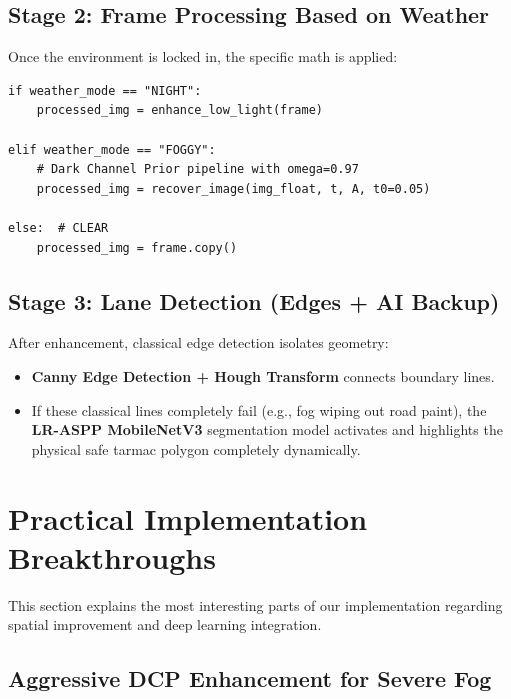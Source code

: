 \documentclass[12pt, a4paper]{article}
\begin{document}
\subsection{Stage 2: Frame Processing Based on Weather}

Once the environment is locked in, the specific math is applied:
\begin{tcolorbox}[
  colback=green!5!white,
  colframe=green!50!black,
  title={\textbf{Mathematical Routing Logic (api.py)}},
  arc=4pt
]
\begin{lstlisting}
if weather_mode == "NIGHT":
    processed_img = enhance_low_light(frame)

elif weather_mode == "FOGGY":
    # Dark Channel Prior pipeline with omega=0.97
    processed_img = recover_image(img_float, t, A, t0=0.05)

else:  # CLEAR
    processed_img = frame.copy()
\end{lstlisting}
\end{tcolorbox}

\subsection{Stage 3: Lane Detection (Edges + AI Backup)}

After enhancement, classical edge detection isolates geometry:
\begin{itemize}
  \item \textbf{Canny Edge Detection + Hough Transform} connects boundary lines.
  \item If these classical lines completely fail (e.g., fog wiping out road paint), the \textbf{LR-ASPP MobileNetV3} segmentation model activates and highlights the physical safe tarmac polygon completely dynamically.
\end{itemize}

\section{Practical Implementation Breakthroughs}

This section explains the most interesting parts of our implementation regarding spatial improvement and deep learning integration.

\subsection{Aggressive DCP Enhancement for Severe Fog}
\label{sec:dcp}
\end{document}
